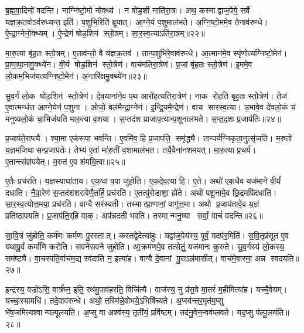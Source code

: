 ब्र॒ह्म॒वा॒दिनो॑ वदन्ति। नाग्नि॑ष्टो॒मो नोक्थ्य॑। न षो॑ड॒शी नाति॑रा॒त्रः। अथ॒ कस्माद्वाज॒पेये॒ सर्वे॑ यज्ञक्र॒तवोऽव॑रुध्यन्त॒ इति॑। प॒शुभि॒रिति॑ ब्रूयात्। आ॒ग्ने॒यं प॒शुमाल॑भते। अ॒ग्नि॒ष्टो॒ममे॒व तेनाव॑रुन्धे। ऐ॒न्द्रा॒ग्नेनो॒क्थ्यम्। ऐ॒न्द्रेण॑ षोड॒शिन॑ स्तो॒त्रम्। सा॒र॒स्व॒त्याऽति॑रा॒त्रम्॥२२॥

मा॒रु॒त्या बृ॑ह॒तः स्तो॒त्रम्। ए॒ताव॑न्तो॒ वै य॑ज्ञक्र॒तव॑। तान्प॒शुभि॑रे॒वाव॑रुन्धे। आ॒त्मान॑मे॒व स्पृ॑णोत्यग्निष्टो॒मेन॑। प्रा॒णा॒पा॒नावु॒क्थ्ये॑न। वी॒र्य षोड॒शिन॑ स्तो॒त्रेण॑। वाच॑मतिरा॒त्रेण॑। प्र॒जां बृ॑ह॒तः स्तो॒त्रेण॑। इ॒ममे॒व लो॒कम॒भिज॑यत्यग्निष्टो॒मेन॑। अ॒न्तरि॑क्षमु॒क्थ्ये॑न॥२३॥

सु॒व॒र्गं लो॒क षो॑ड॒शिन॑ स्तो॒त्रेण॑। दे॒व॒याना॑ने॒व प॒थ आरो॑हत्यतिरा॒त्रेण॑। नाक रोहति बृह॒तः स्तो॒त्रेण॑। तेज॑ ए॒वात्मन्ध॑त्त आग्ने॒येन॑ प॒शुना। ओजो॒ बल॑मैन्द्रा॒ग्नेन॑। इ॒न्द्रि॒यमै॒न्द्रेण॑। वाच सारस्व॒त्या। उ॒भावे॒व दे॑वलो॒कं च॑ मनुष्यलो॒कं चा॒भिज॑यति मारु॒त्या व॒शया। स॒प्तद॑श प्राजाप॒त्यान्प॒शूनाल॑भते। स॒प्त॒द॒शः प्र॒जाप॑तिः॥२४॥

प्र॒जाप॑ते॒राप्त्यै। श्या॒मा एक॑रूपा भवन्ति। ए॒वमि॑व॒ हि प्र॒जाप॑ति॒ समृ॑द्ध्यै। तान्पर्य॑ग्निकृता॒नुत्सृ॑जति। म॒रुतो॑ य॒ज्ञम॑जिघासन्प्र॒जाप॑तेः। तेभ्य॑ ए॒तां मा॑रु॒तीं व॒शामाल॑भत। तयै॒वैना॑नशमयत्। मा॒रु॒त्या प्र॒चर्य॑। ए॒तान्त्संज्ञ॑पयेत्। म॒रुत॑ ए॒व श॑मयि॒त्वा॥२५॥

ए॒तैः प्रच॑रति। य॒ज्ञस्याघा॑ताय। ए॒क॒धा व॒पा जु॑होति। ए॒क॒दे॒व॒त्या॑ हि। ए॒ते। अथो॑ एक॒धैव यज॑माने वी॒र्यं॑ दधाति। नै॒वा॒रेण॑ स॒प्तद॑शशरावेणै॒तर्\mbox{}हि॒ प्रच॑रति। ए॒तत्पु॑रोडाशा॒ ह्ये॑ते। अथो॑ पशू॒नामे॒व छि॒द्रमपि॑दधाति। सा॒र॒स्व॒त्योत्त॒मया॒ प्रच॑रति। वाग्वै सर॑स्वती। तस्मात्प्रा॒णानां॒ वागु॑त्त॒मा। अथो प्र॒जाप॑तावे॒व य॒ज्ञं प्रति॑ष्ठापयति। प्र॒जाप॑ति॒र्‌हि वाक्। अप॑न्नदती भवति। तस्मान्मनु॒ष्या सर्वां॒ वाचं॑ वदन्ति॥२६॥\anuvakamend[अ॒ति॒रा॒त्रम॒न्तरि॑क्षमु॒क्थ्ये॑न प्र॒जाप॑तिः शमयि॒त्वोत्त॒मया॒ प्रच॑रति॒ षट् च॑]

सा॒वि॒त्रं जु॑होति॒ कर्म॑णः कर्मणः पु॒रस्तात्। कस्तद्वे॒देत्या॑हुः। यद्वा॑ज॒पेय॑स्य॒ पूर्वं॒ यदप॑र॒मिति॑। स॒वि॒तृप्र॑सूत ए॒व य॑थापू॒र्वं कर्मा॑णि करोति। सव॑नेसवने जुहोति। आ॒क्रम॑णमे॒व तत्सेतुं॒ यज॑मानः कुरुते। सु॒व॒र्गस्य॑ लो॒कस्य॒ सम॑ष्ट्यै। वा॒चस्पति॒र्वाच॑म॒द्य स्व॑दाति न॒ इत्या॑ह। वाग्वै दे॒वानां पु॒राऽन्न॑मासीत्। वाच॑मे॒वास्मा॒ अन्न स्वदयति॥२७॥

इन्द्र॑स्य॒ वज्रो॑ऽसि॒ वार्त्र॑घ्न॒ इति॒ रथ॑मु॒पाव॑हरति॒ विजि॑त्यै। वाज॑स्य॒ नु प्र॑स॒वे मा॒तरं॑ म॒हीमित्या॑ह। यच्चै॒वेयम्। यच्चा॒स्यामधि॑। तदे॒वाव॑रुन्धे। अथो॒ तस्मि॑न्ने॒वोभये॒ऽभिषि॑च्यते। अ॒प्स्व॑न्तर॒मृत॑म॒प्सु भे॑ष॒जमित्यश्वान्पल्पूलयति। अ॒प्सु वा अश्व॑स्य॒ तृती॑यं॒ प्रवि॑ष्टम्। तद॑नु॒वेन॒न्वव॑प्लवते। यद॒प्सु प॑ल्पू॒लय॑ति॥२८॥

